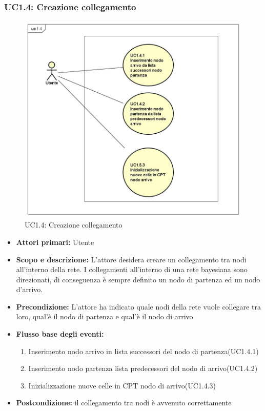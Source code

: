 \subsubsection{UC1.4: Creazione collegamento} 
\begin{figure} [H]
	\centering
	\includegraphics[scale=0.45]{Img/UC1-4} 
	\caption{UC1.4: Creazione collegamento} \label{} 
\end{figure} 
\begin{itemize} 
	\item{\textbf{Attori primari:} Utente} 
	\item{\textbf{Scopo e descrizione:} L'attore desidera creare un collegamento tra nodi all'interno della rete. I collegamenti all'interno di una rete bayesiana sono direzionati, di conseguenza è sempre definito un nodo di partenza ed un nodo d'arrivo.} 
	\item{\textbf{Precondizione:} L'attore ha indicato quale nodi della rete vuole collegare tra loro, qual'è il nodo di partenza e qual'è il nodo di arrivo} 
	\item{\textbf{Flusso base degli eventi:} } 
		\begin{enumerate} 
			\item{Inserimento nodo arrivo in lista successori del nodo di partenza(UC1.4.1)} 
			\item{Inserimento nodo partenza lista predecessori del nodo di arrivo(UC1.4.2)} 
			\item{Inizializzazione nuove celle in CPT nodo di arrivo(UC1.4.3)} 
		\end{enumerate} 
	\item{\textbf{Postcondizione:} il collegamento tra nodi è avvenuto correttamente} 
\end{itemize} 
